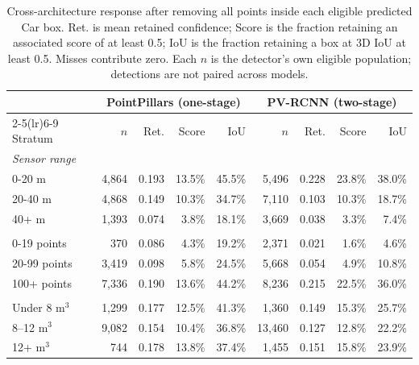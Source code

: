 \begin{table}[t]
\centering
\caption{Cross-architecture response after removing all points inside each eligible predicted Car box. Ret. is mean retained confidence; Score is the fraction retaining an associated score of at least 0.5; IoU is the fraction retaining a box at 3D IoU at least 0.5. Misses contribute zero. Each $n$ is the detector's own eligible population; detections are not paired across models.}
\label{tab:cross_detector_comparison}
\small
\setlength{\tabcolsep}{4pt}
\begin{tabular}{lrrrrrrrr}
\toprule
& \multicolumn{4}{c}{PointPillars (one-stage)} & \multicolumn{4}{c}{PV-RCNN (two-stage)} \\
\cmidrule(lr){2-5}\cmidrule(lr){6-9}
Stratum & $n$ & Ret. & Score & IoU & $n$ & Ret. & Score & IoU \\
\midrule
\multicolumn{9}{l}{\textit{Sensor range}} \\
0-20 m & 4,864 & 0.193 & 13.5\% & 45.5\% & 5,496 & 0.228 & 23.8\% & 38.0\% \\
20-40 m & 4,868 & 0.149 & 10.3\% & 34.7\% & 7,110 & 0.103 & 10.3\% & 18.7\% \\
40+ m & 1,393 & 0.074 & 3.8\% & 18.1\% & 3,669 & 0.038 & 3.3\% & 7.4\% \\
\addlinespace
\multicolumn{9}{l}{\textit{Interior points}} \\
0-19 points & 370 & 0.086 & 4.3\% & 19.2\% & 2,371 & 0.021 & 1.6\% & 4.6\% \\
20-99 points & 3,419 & 0.098 & 5.8\% & 24.5\% & 5,668 & 0.054 & 4.9\% & 10.8\% \\
100+ points & 7,336 & 0.190 & 13.6\% & 44.2\% & 8,236 & 0.215 & 22.5\% & 36.0\% \\
\addlinespace
\multicolumn{9}{l}{\textit{Predicted volume}} \\
Under 8 m$^3$ & 1,299 & 0.177 & 12.5\% & 41.3\% & 1,360 & 0.149 & 15.3\% & 25.7\% \\
8--12 m$^3$ & 9,082 & 0.154 & 10.4\% & 36.8\% & 13,460 & 0.127 & 12.8\% & 22.2\% \\
12+ m$^3$ & 744 & 0.178 & 13.8\% & 37.4\% & 1,455 & 0.151 & 15.8\% & 23.9\% \\
\bottomrule
\end{tabular}
\end{table}
